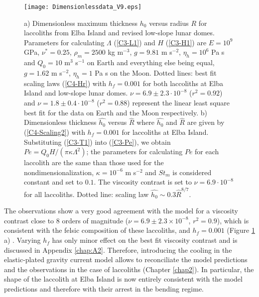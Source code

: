 \begin{figure}[h!]
  \begin{center}
    \graphicspath{ {/Users/thorey/Documents/These/Projet/Refroidissement/Skin_Model/Figure/Figure_Heating/} }
    \texttt{[image: Dimensionlessdata\_V9.eps]}
    \caption{a)  Dimensionless maximum  thickness $h_0$  versus radius
      $R$ for laccoliths from Elba  Island and revised low-slope lunar
      domes.  Parameters  for calculating $\Lambda$  (\ref{C3-L1}) and
      $H$    (\ref{C3-H1})    are    $E=10^9$    GPa,    $\nu^*=0.25$,
      $\rho_m = 2500$ kg m$^{-3}$, $g=9.81$ m s$^{-2}$, $\eta_h =10^6$
      Pa s and $Q_0 = 10$  m$^3$ s$^{-1}$ on Earth and everything else
      being equal, $g=1.62$ m s$^{-2}$, $\eta_h  =1$ Pa s on the Moon.
      Dotted  lines:   best  fit   scaling  laws   (\ref{C4-Hr})  with
      $h_f = 0.001$  for both laccoliths at Elba  Island and low-slope
      lunar domes.  $\nu = 6.9\pm  2.3 \cdot 10^{-8}$ ($r^2=0.92$) and
      $\nu  = 1.8\pm  0.4  \cdot 10^{-8}$  ($r^2=0.88$) represent  the
      linear least square best fit for  the data on Earth and the Moon
      respectively.   b)  Dimensionless thickness  $\hat{h_0}$  versus
      $\hat{R}$  where   $\hat{h_0}$  and   $\hat{R}$  are   given  by
      (\ref{C4-Scaling2})  with  $h_f=0.001$  for laccoliths  at  Elba
      Island.   Substituting  (\ref{C3-T1})   into  (\ref{C3-Pe}),  we
      obtain $Pe = Q_0 H  /(\pi \kappa \Lambda^2)$; the parameters for
      calculating $Pe$ for each laccolith are the same than those used
      for the  nondimensionalization, $\kappa=10^{-6}$ m  s$^{-2}$ and
      $St_m$ is considered  constant and set to  $0.1$.  The viscosity
      contrast is set  to $\nu =6.9\cdot 10^{-8}$  for all laccoliths.
      Dotted line: scaling law $ \hat{h_0} \sim 0.3\hat{R}^{8/7}$.}
    \label{C4-Data}
  \end{center}
\end{figure}

The  observations show  a very  good agreement  with the  model for  a
viscosity    contrast   close    to    $8$    orders   of    magnitude
($\nu =  6.9\pm 2.3 \times  10^{-8}$, $r^2=0.9$), which  is consistent
with  the  felsic composition  of  these  laccoliths, and  $h_f=0.001$
(Figure \ref{C4-Data} a) \citep{Marsh:1981dc,Diniega:2013eh}.  Varying
$h_f$ has only minor effect on  the best fit viscosity contrast and is
discussed  in  Appendix  \ref{chap:A2}.   Therefore,  introducing  the
cooling  in  the  elastic-plated   gravity  current  model  allows  to
reconciliate the model predictions and the observations in the case of
laccoliths  (Chapter \ref{chap2}).   In particular,  the shape  of the
laccolith at  Elba Island  is now entirely  consistent with  the model
predictions and therefore with their arrest in the bending regime.

